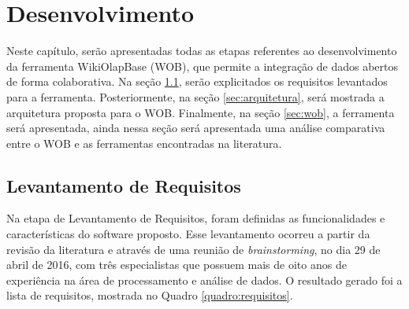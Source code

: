 \chapter{Desenvolvimento}
\label{chap:desenvolvimento}

Neste capítulo, serão apresentadas todas as etapas referentes ao desenvolvimento da ferramenta
WikiOlapBase (WOB), que permite a integração de dados abertos de forma colaborativa. Na seção
\ref{sec:requisitos}, serão explicitados os requisitos levantados para a ferramenta. 
Posteriormente, na seção \ref{sec:arquitetura}, será mostrada a arquitetura proposta para o 
WOB. Finalmente, na seção \ref{sec:wob}, a ferramenta será apresentada, ainda nessa seção será 
apresentada uma análise comparativa entre o WOB e as ferramentas encontradas na literatura.

\section{Levantamento de Requisitos}
\label{sec:requisitos}

Na etapa de Levantamento de Requisitos, foram definidas as funcionalidades e características 
do software proposto. Esse levantamento ocorreu a partir da revisão da literatura e através 
de uma reunião de \textit{brainstorming}, no dia 29 de abril de 2016, com três especialistas 
que possuem mais de oito anos de experiência na área de processamento e análise de dados. 
O resultado gerado foi a lista de requisitos, mostrada no Quadro \ref{quadro:requisitos}.

